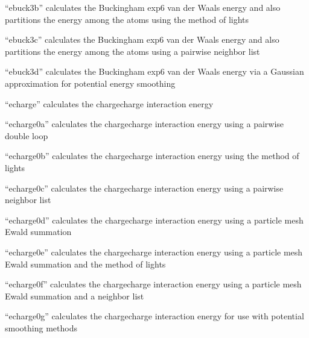 \documentclass[letterpaper,11pt,english]{sphinxmanual}
\begin{document}

“ebuck3b” calculates the Buckingham exp\sphinxhyphen{}6 van der Waals
energy and also partitions the energy among the atoms using
the method of lights


“ebuck3c” calculates the Buckingham exp\sphinxhyphen{}6 van der Waals energy
and also partitions the energy among the atoms using a pairwise
neighbor list


“ebuck3d” calculates the Buckingham exp\sphinxhyphen{}6 van der Waals energy
via a Gaussian approximation for potential energy smoothing


“echarge” calculates the charge\sphinxhyphen{}charge interaction energy


“echarge0a” calculates the charge\sphinxhyphen{}charge interaction energy
using a pairwise double loop


“echarge0b” calculates the charge\sphinxhyphen{}charge interaction energy
using the method of lights


“echarge0c” calculates the charge\sphinxhyphen{}charge interaction energy
using a pairwise neighbor list


“echarge0d” calculates the charge\sphinxhyphen{}charge interaction energy
using a particle mesh Ewald summation


“echarge0e” calculates the charge\sphinxhyphen{}charge interaction energy
using a particle mesh Ewald summation and the method of lights


“echarge0f” calculates the charge\sphinxhyphen{}charge interaction energy
using a particle mesh Ewald summation and a neighbor list


“echarge0g” calculates the charge\sphinxhyphen{}charge interaction energy
for use with potential smoothing methods
\end{document}
